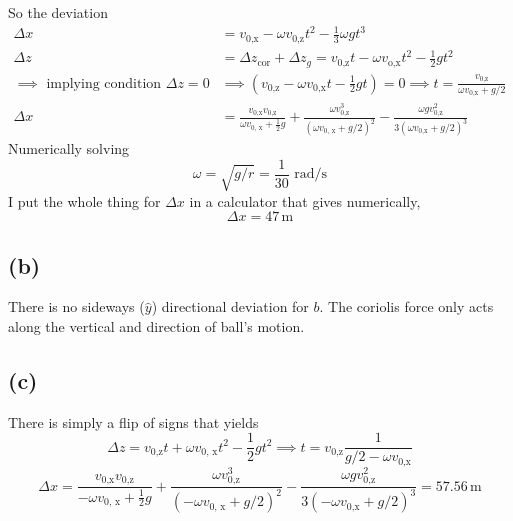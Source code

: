 \documentclass[letter, 10pts]{article}
\begin{document}
So the deviation 
\begin{align*}
\Delta x &= v_\text{0,x} - \omega v_\text{0,z} t^2 - \frac{1}{3} \omega g t^3   \\
\Delta z &= \Delta z_\text{cor} + \Delta z_g = v_\text{0,z}t - \omega v_\text{o,x} t^2 - \frac{1}{2} g t^2 \\ 
\implies \text{ implying condition } \Delta z = 0 &\implies 
(v_\text{0,z} - \omega v_\text{0,x} t - \frac{1}{2} g t) = 0 \implies t = \frac{v_\text{0,z}}{\omega v_\text{0,x} + g / 2} \\ 
\Delta x &= 
\frac{v_\text{0,x} v_\text{0,z}}{\omega v_\text{0, x} + \frac{1}{2} g }
+
\frac{\omega v_\text{0,z}^3}{(\omega v_\text{0, x} + g / 2 ) ^2 } 
- 
\frac{\omega g v_\text{0,z}^2}{3 (\omega v_\text{0,x} +   g / 2) ^3}
\end{align*}
Numerically solving 
\[
\omega = \sqrt{g / r}  = \frac{1}{30} \text{ rad/s}
\] 
I put the whole thing for $\Delta x$ in a calculator that gives numerically, 
\[
\Delta x = 47 \, \text{m}
\] 




\subsection*{(b)}
There is no sideways ($\hat{y}$) directional deviation for $b$. The coriolis force only acts along the vertical and direction of ball's motion.


\subsection*{(c)} 
There is simply a flip of signs that yields 
\[
\Delta z = 
v_\text{0,z} t + \omega v_\text{0, x} t^2 - \frac{1}{2} g t^2 \implies t = 
v_\text{0,z} \frac{1}{g / 2 - \omega v_\text{0,x}}
\] 
\[
\Delta x = 
\frac{v_\text{0,x} v_\text{0,z}}{ - \omega v_\text{0, x} + \frac{1}{2} g }
+
\frac{\omega v_\text{0,z}^3}{ ( - \omega v_\text{0, x} + g / 2 ) ^2 } 
- 
\frac{\omega g v_\text{0,z}^2}{3 ( - \omega v_\text{0,x} +   g / 2) ^3} = 
\boxed{
57.56 \, \text{m}
}
\] 
\end{document}
